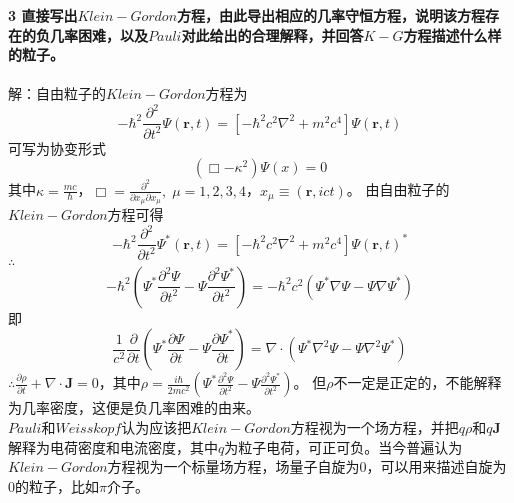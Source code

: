 \documentclass[12pt]{article}
\numberwithin{equation}{section}	 %
\begin{document}
\begin{spacing}{1.5}
\textbf{3 \quad 直接写出$Klein-Gordon$方程，由此导出相应的几率守恒方程，说明该方程存在的负几率困难，以及$Pauli$对此给出的合理解释，并回答$K-G$方程描述什么样的粒子。}\\
~\\
解：自由粒子的$Klein-Gordon$方程为
\begin{equation}
-\hbar^{2}\frac{\partial^{2}}{\partial t^{2}} \Psi(\bm{r},t) = \left[ -\hbar^{2}c^{2}\nabla^{2}+m^{2}c^{4} \right] \Psi(\bm{r},t)
\end{equation}
可写为协变形式
\begin{equation}
\left(\Box-\kappa^{2}\right)\Psi(x) = 0
\end{equation}
其中$\displaystyle \kappa=\frac{mc}{\hbar}$，$\displaystyle \Box=\frac{\partial^{2}}{\partial x_{\mu}\partial x_{\mu}},\;\mu=1,2,3,4$，$x_{\mu} \equiv \left( \bm{r},ict \right)$。
由自由粒子的$Klein-Gordon$方程可得
\begin{equation}
-\hbar^{2}\frac{\partial^{2}}{\partial t^{2}} \Psi^{*}(\bm{r},t) = \left[ -\hbar^{2}c^{2}\nabla^{2}+m^{2}c^{4} \right] \Psi(\bm{r},t)^{*}
\end{equation}
$\therefore$ 
\begin{equation}
-\hbar^{2}\left(\Psi^{*}\frac{\partial^{2}\Psi}{\partial t^{2}} - \Psi\frac{\partial^{2}\Psi^{*}}{\partial t^{2}} \right) = -\hbar^{2}c^{2}\left( \Psi^{*}\nabla\Psi - \Psi\nabla\Psi^{*} \right)
\end{equation}
即
\begin{equation}
\frac{1}{c^{2}}\frac{\partial}{\partial t}\left(\Psi^{*}\frac{\partial\Psi}{\partial t} - \Psi\frac{\partial\Psi^{*}}{\partial t} \right) = \nabla\cdot\left( \Psi^{*}\nabla^{2}\Psi - \Psi\nabla^{2}\Psi^{*} \right)
\end{equation}
$\therefore \displaystyle \frac{\partial\rho}{\partial t}+\nabla\cdot\bm{J} = 0$，其中$\displaystyle \rho = \frac{i\hbar}{2mc^{2}}\left(\Psi^{*}\frac{\partial^{2}\Psi}{\partial t^{2}} - \Psi\frac{\partial^{2}\Psi^{*}}{\partial t^{2}} \right)$。 但$\rho$不一定是正定的，不能解释为几率密度，这便是负几率困难的由来。\\
$Pauli$和$Weisskopf$认为应该把$Klein-Gordon$方程视为一个场方程，并把$q\rho$和$q\bm{J}$解释为电荷密度和电流密度，其中$q$为粒子电荷，可正可负。当今普遍认为$Klein-Gordon$方程视为一个标量场方程，场量子自旋为$0$，可以用来描述自旋为$0$的粒子，比如$\pi$介子。
~\\
~\\




\end{spacing}
\end{document}
